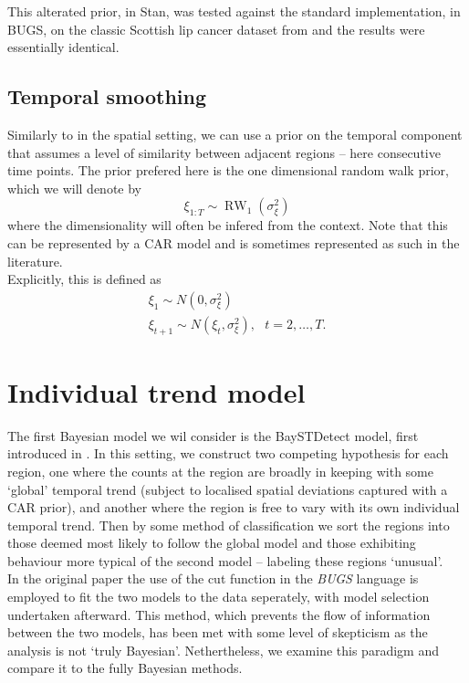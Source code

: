\documentclass[11pt]{report}
\begin{document}
This alterated prior, in Stan, was tested against the standard implementation, in BUGS, on the classic Scottish lip cancer dataset from \citet{lipcancer} and the results were essentially identical.   

\section{Temporal smoothing}

Similarly to in the spatial setting, we can use a prior on the temporal component that assumes a level of similarity between adjacent regions -- here consecutive time points. The prior prefered here is the one dimensional random walk prior, which we will denote by
\begin{equation}
\xi_{1:T} \sim \operatorname{RW}_1(\sigma_\xi^2)
\end{equation}
where the dimensionality will often be infered from the context. Note that this can be represented by a CAR model and is sometimes represented as such in the literature. \\

Explicitly, this is defined as
\begin{gather}
\xi_1 \sim N(0, \sigma_\xi^2) \\
\xi_{t+1} \sim N(\xi_{t}, \sigma_{\xi}^2), \ \ \ t = 2, \ldots, T.
\end{gather}

\chapter{Individual trend model}

The first Bayesian model we wil consider is the BaySTDetect model, first introduced in \citet{baystdetect}. In this setting, we construct two competing hypothesis for each region, one where the counts at the region are broadly in keeping with some `global' temporal trend (subject to localised spatial deviations captured with a CAR prior), and another where the region is free to vary with its own individual temporal trend. Then by some method of classification we sort the regions into those deemed most likely to follow the global model and those exhibiting behaviour more typical of the second model -- labeling these regions `unusual'. \\

In the original paper \citet{baystdetect} the use of the cut function in the \emph{BUGS} language is employed to fit the two models to the data seperately, with model selection undertaken afterward. This method, which prevents the flow of information between the two models, has been met with some level of skepticism \citep{gelmancut} as the analysis is not `truly Bayesian'. Nethertheless, we examine this paradigm and compare it to the fully Bayesian methods. 
\end{document}
